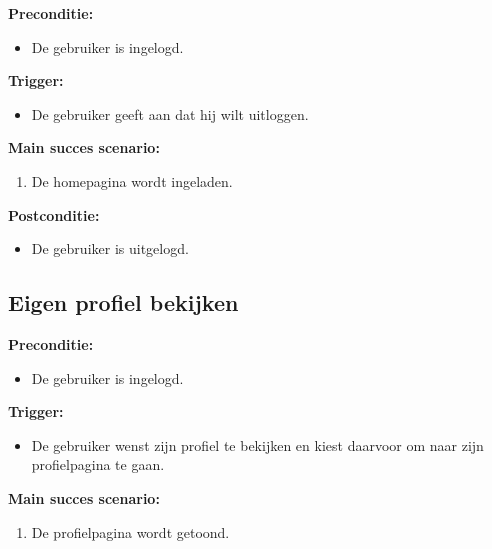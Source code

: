 \documentclass[11pt,twoside,a4paper]{article}
\newcommand{\subpunt}[1]{
	\noindent
	\textbf{\small{#1}}
}
\newenvironment{precond}{
	\subpunt{Preconditie:}
	\begin{itemize}[label={}]
}{
	\end{itemize}
}
\newenvironment{trigger}{
	\subpunt{Trigger:}
	\begin{itemize}[label={}]
}{
	\end{itemize}
}
\newenvironment{mainss}{
	\subpunt{Main succes scenario:}
	\begin{enumerate}
}{
	\end{enumerate}
}
\newenvironment{except}{
	\subpunt{Exception flow:}
	\begin{enumerate}
}{
	\end{enumerate}
}
\newenvironment{postcond}{
	\subpunt{Postconditie:}
	\begin{itemize}[label={}]
}{
	\end{itemize}
}
\newcommand{\flowidx}{0}
\newcounter{nstap}
\newcommand{\flowtitle}[1]{					%
	\setcounter{nstap}{0}
	\item[\flowidx.][\emph{#1}]
}
\newcommand{\flowstap}{ 					%
	\stepcounter{nstap}
	\item[\flowidx.\arabic{nstap}]
}
\newenvironment{flow}[2]{					
	\renewcommand{\flowidx}{#1}
	
	\flowtitle{#2}
	\begin{enumerate}
}{
	\end{enumerate}
}
\begin{document}
	\begin{precond}
		\item De gebruiker is ingelogd.
	\end{precond}
	
	\begin{trigger}
		\item De gebruiker geeft aan dat hij wilt uitloggen.
	\end{trigger}
	
	\begin{mainss}
		\item De homepagina wordt ingeladen.\label{logout_end}
	\end{mainss}
	
	
	\begin{postcond}
		\item De gebruiker is uitgelogd.
	\end{postcond}
	
	\subsection{Eigen profiel bekijken}\label{own_profile}
	
	\begin{precond}
		\item De gebruiker is ingelogd.
	\end{precond}
	
	\begin{trigger}
		\item De gebruiker wenst zijn profiel te bekijken en kiest daarvoor om naar zijn profielpagina te gaan.
	\end{trigger}
	
	\begin{mainss}
		\item De profielpagina wordt getoond.
	\end{mainss}
	
\end{document}
